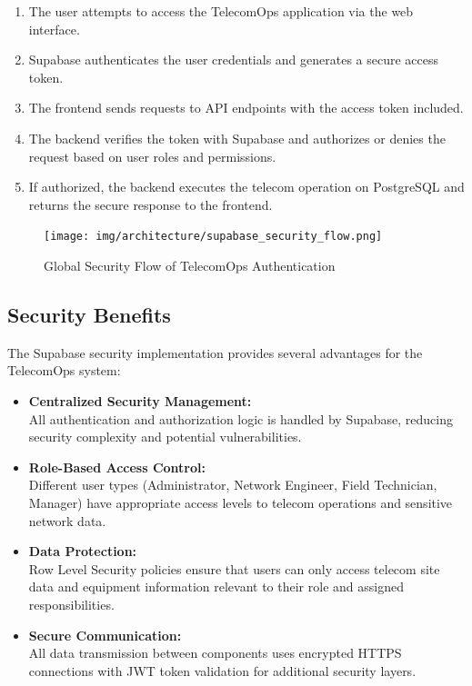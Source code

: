 \begin{enumerate}
\item The user attempts to access the TelecomOps application via the web interface.
\item Supabase authenticates the user credentials and generates a secure access token.
\item The frontend sends requests to API endpoints with the access token included.
\item The backend verifies the token with Supabase and authorizes or denies the request based on user roles and permissions.
\item If authorized, the backend executes the telecom operation on PostgreSQL and returns the secure response to the frontend.
\end{enumerate}

\begin{figure}[H]
    \centering
    \texttt{[image: img/architecture/supabase\_security\_flow.png]}
    \caption{Global Security Flow of TelecomOps Authentication}
    \label{fig:security_flow}
\end{figure}

\subsection{Security Benefits}
The Supabase security implementation provides several advantages for the TelecomOps system:

\vspace{0.5cm}

\begin{itemize}
\item \textbf{Centralized Security Management:} \\
All authentication and authorization logic is handled by Supabase, reducing security complexity and potential vulnerabilities.

\vspace{0.5cm}

\item \textbf{Role-Based Access Control:} \\
Different user types (Administrator, Network Engineer, Field Technician, Manager) have appropriate access levels to telecom operations and sensitive network data.

\vspace{0.5cm}

\item \textbf{Data Protection:} \\
Row Level Security policies ensure that users can only access telecom site data and equipment information relevant to their role and assigned responsibilities.

\vspace{0.5cm}

\item \textbf{Secure Communication:} \\
All data transmission between components uses encrypted HTTPS connections with JWT token validation for additional security layers.
\end{itemize}